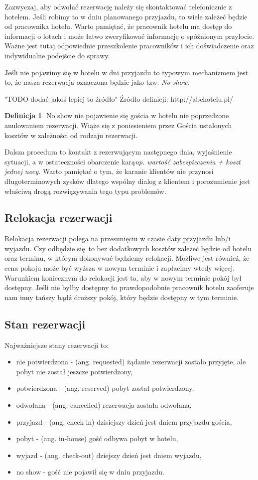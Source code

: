 \documentclass[a4paper,onecolumn,oneside,11pt,wide,floatssmall]{mwrep}
\theoremstyle{definition}
\newtheorem{defn}{Definicja}[section]
\theoremstyle{plain}%
\theoremstyle{remark}
\begin{document}
Zazwyczaj, aby odwołać rezerwację należy się skontaktować telefonicznie z 
hotelem. Jeśli robimy to w dniu planowanego przyjazdu, to wiele 
zależeć będzie od pracownika hotelu. Warto pamiętać, że pracownik hotelu ma 
dostęp do informacji o lotach i może łatwo zweryfikować informację o 
spóźnionym przylocie. Ważne jest tutaj odpowiednie przeszkolenie pracowników 
i ich doświadczenie oraz indywidualne podejście do sprawy.

Jeśli nie pojawimy się w hotelu w dni przyjazdu to typowym mechanizmem jest 
to, że nasza rezerwacja oznaczona będzie jako tzw. \emph{No show}. 

"TODO dodać jakoś lepiej to źródło"
Źródło definicji: http://abchotelu.pl/
\begin{defn}{No show}
nie pojawienie się gościa w hotelu nie poprzedzone anulowaniem rezerwacji. 
Wiąże się z poniesieniem przez Gościa ustalonych kosztów w zależności od 
rodzaju rezerwacji. 
\end{defn}

Dalsza procedura to kontakt z rezerwującym następnego dnia, wyjaśnienie 
sytuacji, a w ostateczności obarczenie karą\emph{np. wartość zabezpieczenia 
+ koszt jednej nocy}. Warto pamiętać o tym, że karanie klientów nie przynosi 
długoterminowych zysków dlatego wspólny dialog z klientem i porozumienie 
jest właściwą drogą rozwiązywania tego typu problemów.

\subsection{Relokacja rezerwacji}
Relokacja rezerwacji polega na przesunięciu w czasie daty przyjazdu lub/i 
wyjazdu. Czy odbędzie się to bez dodatkowych kosztów zależeć będzie od 
hotelu oraz terminu, w którym dokonywać będziemy relokacji. Możliwe jest 
również, że cena pokoju może być wyższa w nowym terminie i zapłacimy wtedy 
więcej. Warunkiem koniecznym do relokacji jest to, aby w nowym terminie 
pokój był dostępny. Jeśli nie byłby dostępny to prawdopodobnie pracownik 
hotelu zaoferuje nam inny tańszy bądź droższy pokój, który będzie dostępny w 
tym terminie.

\subsection{Stan rezerwacji}
Najważniejsze stany rezerwacji to:
\begin{itemize}
  \item nie potwierdzona - (ang. requested) żądanie rezerwacji zostało przyjęte, ale pobyt nie został jeszcze potwierdzony,
  \item potwierdzona - (ang. reserved) pobyt został potwierdzony,
  \item odwołana - (ang. cancelled) rezerwacja została odwołana,
  \item przyjazd - (ang. check-in) dzisiejszy dzień jest dniem przyjazdu gościa,
  \item pobyt - (ang. in-house) gość odbywa pobyt w hotelu,
  \item wyjazd - (ang. check-out) dziejszy dzień jest dniem wyjazdu,
  \item no show - gość nie pojawił się w dniu przyjazdu.
\end{itemize}
\end{document}
